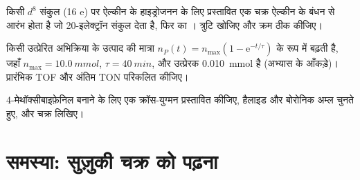 \begin{exercise}[$\star\star\star$]\label{exo:b2:catalytic-cycles:10}
किसी $d^8$ संकुल  (16 e) पर ऐल्कीन के हाइड्रोजनन के लिए प्रस्तावित एक चक्र
ऐल्कीन के बंधन से आरंभ होता है जो 20-इलेक्ट्रॉन संकुल देता है, फिर  का
। त्रुटि खोजिए और क्रम ठीक कीजिए।
\end{exercise}

\begin{exercise}[$\star\star\star$]\label{exo:b2:catalytic-cycles:11}
किसी उत्प्रेरित अभिक्रिया के उत्पाद की मात्रा $n_P(t) = n_{\max}(1 - \mathrm e^{-t/\tau})$ के रूप में बढ़ती है,
जहाँ $n_{\max} = \qty{10.0}{mmol}$, $\tau = \qty{40}{min}$, और उत्प्रेरक \qty{0.010}{mmol} है
(अभ्यास के आँकड़े)। प्रारंभिक TOF और अंतिम TON परिकलित कीजिए।
\end{exercise}

\begin{exercise}[$\star\star\star$]\label{exo:b2:catalytic-cycles:12}
4-मेथॉक्सीबाइफ़ेनिल बनाने के लिए एक क्रॉस-युग्मन प्रस्तावित कीजिए, हैलाइड और बोरोनिक
अम्ल चुनते हुए, और चक्र लिखिए।
\end{exercise}

\section{समस्या: सुज़ुकी चक्र को पढ़ना}

